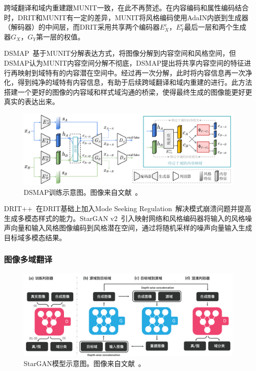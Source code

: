 跨域翻译和域内重建跟MUNIT一致，在此不再赘述。在内容编码和属性编码结合时，DRIT和MUNIT有一定的差异，MUNIT将风格编码使用AdaIN内嵌到生成器（解码器）的中间层，而DRIT采用共享两个编码器$E_X^c$，$E_Y^c$最后一层和两个生成器$G_X$，$G_Y$第一层的权值。

DSMAP~\cite{chang2020domain}基于MUNIT分解表达方式，将图像分解到内容空间和风格空间，但DSMAP认为MUNIT内容空间分解不彻底，DSMAP提出将共享内容空间的特征进行再映射到域特有的内容潜在空间中。经过再一次分解，此时将内容信息再一次净化，得到纯净的域特有内容信息，有助于后续跨域翻译和域内重建的进行。此方法搭建一个更好的图像的内容域和样式域沟通的桥梁，使得最终生成的图像能更好更真实的表达出来。

\begin{figure}[ht]
    \centering
	\includegraphics[width=\textwidth]{figures/DSMAP.pdf}
	\caption{DSMAP训练示意图。图像来自文献~\cite{chang2020domain}。}
	\label{fig:dsmap}
\end{figure}

DRIT++~\cite{lee2020drit++}在DRIT基础上加入Mode Seeking Regulation~\cite{mao2019mode}解决模式崩溃问题并提高生成多模态样式的能力。StarGAN v2~\cite{choi2020stargan}引入映射网络和风格编码器将输入的风格噪声向量和输入风格图像编码到风格潜在空间，通过将随机采样的噪声向量输入生成目标域多模态结果。

\subsubsection{图像多域翻译}

\begin{figure}[ht]
    \centering
	\includegraphics[width=\textwidth]{figures/star.png}
	\caption{StarGAN模型示意图。图像来自文献~\cite{choi2018stargan}。}
	\label{fig:star}
\end{figure}


